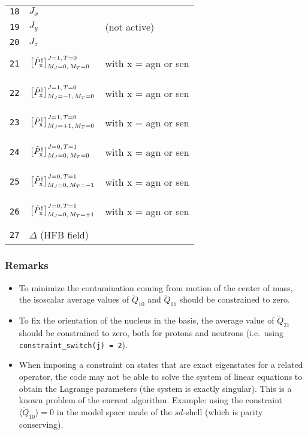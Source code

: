 \documentclass[a4paper,11pt]{article}
\newcommand{\ttt}[1]{\texttt{#1}}
\begin{document}
\begin{center}
\begin{tabular}{|r|ll|}
 \ttt{18} & $J_x$ & \\
 \ttt{19} & $J_y$ & (not active) \\
 \ttt{20} & $J_z$ & \\
 \ttt{21} & $\vphantom{\Bigg(} \left[ \tilde{P}^\dagger_{\text{x}} \right]^{J=1,\, T=0}_{M_J =0,\,  M_T =0}$ &with x = agn or sen \\
 \ttt{22} & $\vphantom{\Bigg(} \left[ \tilde{P}^\dagger_{\text{x}} \right]^{J=1,\, T=0}_{M_J =-1,\, M_T =0}$ &with x = agn or sen \\
 \ttt{23} & $\vphantom{\Bigg(} \left[ \tilde{P}^\dagger_{\text{x}} \right]^{J=1,\, T=0}_{M_J =+1,\, M_T =0}$ &with x = agn or sen \\
 \ttt{24} & $\vphantom{\Bigg(} \left[ \tilde{P}^\dagger_{\text{x}} \right]^{J=0,\, T=1}_{M_J =0,\, M_T =0}$  &with x = agn or sen \\
 \ttt{25} & $\vphantom{\Bigg(} \left[ \tilde{P}^\dagger_{\text{x}} \right]^{J=0,\, T=1}_{M_J =0,\, M_T =-1}$ &with x = agn or sen \\
 \ttt{26} & $\vphantom{\Bigg(} \left[ \tilde{P}^\dagger_{\text{x}} \right]^{J=0,\, T=1}_{M_J =0,\, M_T =+1}$ &with x = agn or sen \\
 \ttt{27} & $\Delta$ (HFB field) & \\
\hline
\end{tabular}
\end{center}

\subsubsection*{Remarks}

\begin{itemize}
  \item To minimize the contamination coming from motion of the center of mass, the isoscalar average values of $\tilde{Q}_{10}$ and $\tilde{Q}_{11}$
  should be constrained to zero.
  \item To fix the orientation of the nucleus in the basis, the average value of $\tilde{Q}_{21}$ should be constrained to zero, both for protons and neutrons 
  (i.e.\ using \ttt{constraint\_switch(j) = 2}).
  \item When imposing a constraint on states that are exact eigenstates for a related operator, the code may not be able to 
  solve the system of linear equations to obtain the Lagrange parameters (the system is exactly singular). This is a known problem of the current algorithm.
  Example: using the constraint $\langle \tilde{Q}_{10} \rangle = 0$ in the model space made of the $sd$-shell (which is parity conserving).
\end{itemize}
\end{document}
